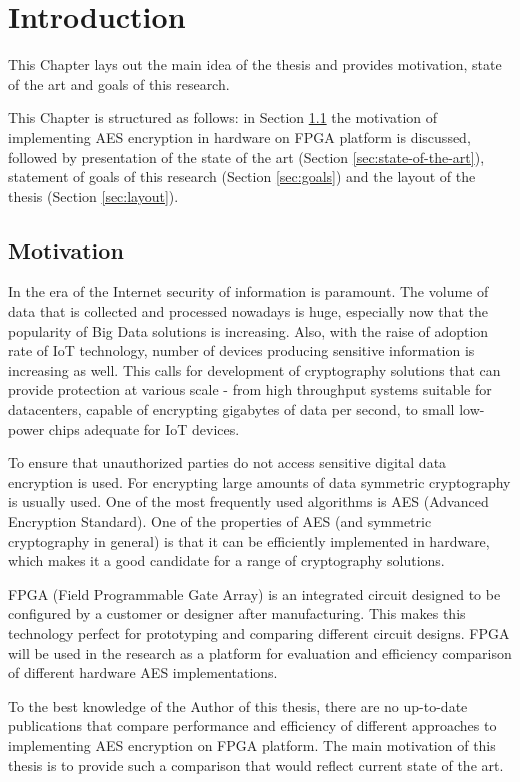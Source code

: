 \section{Introduction}
This Chapter lays out the main idea of the thesis and provides motivation, state of the art and goals of this research.

This Chapter is structured as follows: in Section \ref{sec:motivation} the motivation of implementing AES encryption in hardware on FPGA platform is discussed, followed by presentation of the state of the art (Section \ref{sec:state-of-the-art}), statement of goals of this research (Section \ref{sec:goals}) and the layout of the thesis (Section \ref{sec:layout}).

\subsection{Motivation}
\label{sec:motivation}
In the era of the Internet security of information is paramount. The volume of data that is collected and processed nowadays is huge, especially now that the popularity of Big Data solutions is increasing. Also, with the raise of adoption rate of IoT technology, number of devices producing sensitive information is increasing as well. This calls for development of cryptography solutions that can provide protection at various scale - from high throughput systems suitable for datacenters, capable of encrypting gigabytes of data per second, to small low-power chips adequate for IoT devices.

To ensure that unauthorized parties do not access sensitive digital data encryption is used. For encrypting large amounts of data symmetric cryptography is usually used. One of the most frequently used algorithms is AES (Advanced Encryption Standard). One of the properties of AES (and symmetric cryptography in general) is that it can be efficiently implemented in hardware, which makes it a good candidate for a range of cryptography solutions.

FPGA (Field Programmable Gate Array) is an integrated circuit designed to be configured by a customer or designer after manufacturing. This makes this technology perfect for prototyping and comparing different circuit designs. FPGA will be used in the research as a platform for evaluation and efficiency comparison of different hardware AES implementations.

To the best knowledge of the Author of this thesis, there are no up-to-date publications that compare performance and efficiency of different approaches to implementing AES encryption on FPGA platform. The main motivation of this thesis is to provide such a comparison that would reflect current state of the art.


